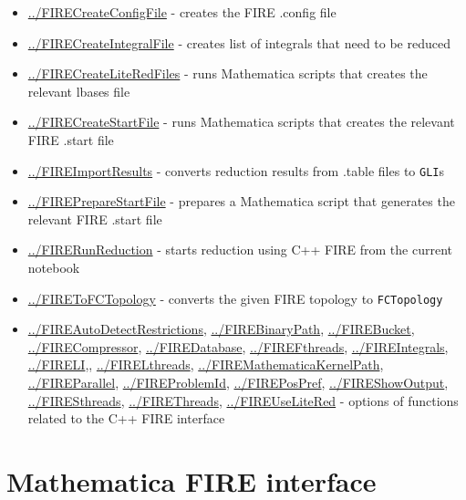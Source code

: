 \documentclass[../FeynHelpersManual.tex]{subfiles}
\begin{document}
\begin{itemize}
\tightlist
\item
  \hyperlink{../firecreateconfigfile}{../FIRECreateConfigFile} - creates
  the FIRE .config file
\item
  \hyperlink{../firecreateintegralfile}{../FIRECreateIntegralFile} -
  creates list of integrals that need to be reduced
\item
  \hyperlink{../firecreateliteredfiles}{../FIRECreateLiteRedFiles} -
  runs Mathematica scripts that creates the relevant lbases file
\item
  \hyperlink{../firecreatestartfile}{../FIRECreateStartFile} - runs
  Mathematica scripts that creates the relevant FIRE .start file
\item
  \hyperlink{../fireimportresults}{../FIREImportResults} - converts
  reduction results from .table files to \texttt{GLI}s
\item
  \hyperlink{../firepreparestartfile}{../FIREPrepareStartFile} -
  prepares a Mathematica script that generates the relevant FIRE .start
  file
\item
  \hyperlink{../firerunreduction}{../FIRERunReduction} - starts
  reduction using C++ FIRE from the current notebook
\item
  \hyperlink{../firetofctopology}{../FIREToFCTopology} - converts the
  given FIRE topology to \texttt{FCTopology}
\item
  \hyperlink{../fireautodetectrestrictions}{../FIREAutoDetectRestrictions},
  \hyperlink{../firebinarypath}{../FIREBinaryPath},
  \hyperlink{../firebucket}{../FIREBucket},
  \hyperlink{../firecompressor}{../FIRECompressor},
  \hyperlink{../firedatabase}{../FIREDatabase},
  \hyperlink{../firefthreads}{../FIREFthreads},
  \hyperlink{../fireintegrals}{../FIREIntegrals},
  \hyperlink{../fireli}{../FIRELI},,
  \hyperlink{../firelthreads}{../FIRELthreads},
  \hyperlink{../firemathematicakernelpath}{../FIREMathematicaKernelPath},
  \hyperlink{../fireparallel}{../FIREParallel},
  \hyperlink{../fireproblemid}{../FIREProblemId},
  \hyperlink{../firepospref}{../FIREPosPref},
  \hyperlink{../fireshowoutput}{../FIREShowOutput},
  \hyperlink{../firesthreads}{../FIRESthreads},
  \hyperlink{../firethreads}{../FIREThreads},
  \hyperlink{../fireuselitered}{../FIREUseLiteRed} - options of
  functions related to the C++ FIRE interface
\end{itemize}

\hypertarget{mathematica fire interface}{
\section{Mathematica FIRE interface}\label{mathematica fire interface}}
\end{document}
